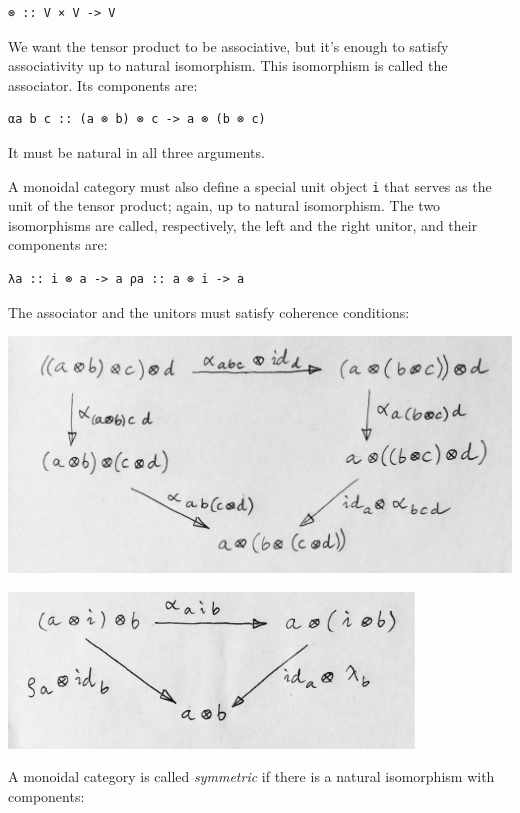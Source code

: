 \begin{verbatim}
⊗ :: V × V -> V
\end{verbatim}

We want the tensor product to be associative, but it's enough to satisfy
associativity up to natural isomorphism. This isomorphism is called the
associator. Its components are:

\begin{verbatim}
αa b c :: (a ⊗ b) ⊗ c -> a ⊗ (b ⊗ c)
\end{verbatim}

It must be natural in all three arguments.

A monoidal category must also define a special unit object \texttt{i}
that serves as the unit of the tensor product; again, up to natural
isomorphism. The two isomorphisms are called, respectively, the left and
the right unitor, and their components are:

\begin{verbatim}
λa :: i ⊗ a -> a ρa :: a ⊗ i -> a
\end{verbatim}

The associator and the unitors must satisfy coherence conditions:

\includegraphics[width=5.31250in]{images/assoc.jpg}

\includegraphics[width=4.23958in]{images/idcoherence.jpg}

A monoidal category is called \emph{symmetric} if there is a natural
isomorphism with components:

